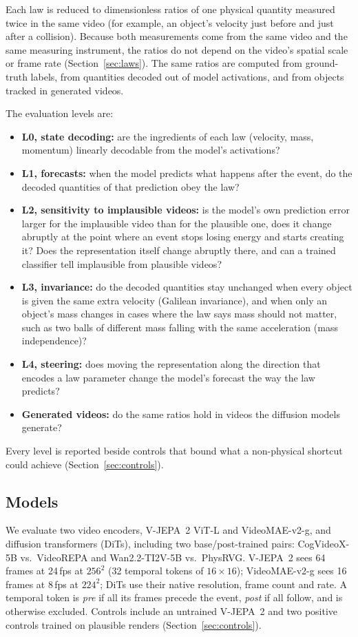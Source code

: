 \documentclass[10pt]{article}
\begin{document}
Each law is reduced to dimensionless ratios of one physical quantity measured twice in the same video (for example,
an object's velocity just before and just after a collision). Because both measurements come from the same video and
the same measuring instrument, the ratios do not depend on the video's spatial scale or frame rate
(Section~\ref{sec:laws}). The same ratios are computed from ground-truth labels, from quantities decoded out of model
activations, and from objects tracked in generated videos.

The evaluation levels are:
\begin{itemize}
\item \textbf{L0, state decoding:} are the ingredients of each law (velocity, mass, momentum) linearly decodable from
the model's activations?
\item \textbf{L1, forecasts:} when the model predicts what happens after the event, do the decoded quantities of that
prediction obey the law?
\item \textbf{L2, sensitivity to implausible videos:} is the model's own prediction error larger for the
implausible video than for the plausible one, does it change abruptly at the point where an event stops losing
energy and starts creating it? Does the representation itself change abruptly there, and can a trained classifier
tell implausible from plausible videos?
\item \textbf{L3, invariance:} do the decoded quantities stay unchanged when every object is given the same extra
velocity (Galilean invariance), and when only an object's mass changes in cases where the law says mass should not
matter, such as two balls of different mass falling with the same acceleration (mass independence)?
\item \textbf{L4, steering:} does moving the representation along the direction that encodes a law parameter change
the model's forecast the way the law predicts?
\item \textbf{Generated videos:} do the same ratios hold in videos the diffusion models generate?
\end{itemize}
Every level is reported beside controls that bound what a non-physical shortcut could achieve
(Section~\ref{sec:controls}).

\subsection{Models}

We evaluate two video encoders, V-JEPA~2 ViT-L and VideoMAE-v2-g, and diffusion transformers
(DiTs), including two base/post-trained pairs: CogVideoX-5B vs.\ VideoREPA and Wan2.2-TI2V-5B vs.\ PhysRVG.
V-JEPA~2 sees 64 frames at 24\,fps at $256^2$ (32 temporal tokens of $16\times16$); VideoMAE-v2-g sees 16 frames at
8\,fps at $224^2$; DiTs use their native resolution, frame count and rate. A temporal token is \emph{pre} if all its
frames precede the event, \emph{post} if all follow, and is otherwise excluded. Controls include an untrained V-JEPA~2
and two positive controls trained on plausible renders (Section~\ref{sec:controls}).
\end{document}

